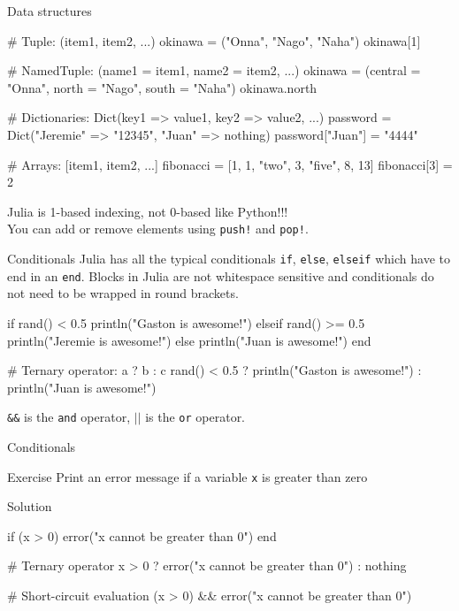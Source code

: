 \documentclass{beamer}
\newenvironment{Boxx}{\begin{tcolorbox}[standard jigsaw, opacityframe=0.8, opacityback=0.0]}{\end{tcolorbox}}
\begin{document}
\begin{frame}[fragile]{Data structures}
	\begin{Boxx}
	\begin{jllisting}
  # Tuple: (item1, item2, ...)
  okinawa = ("Onna", "Nago", "Naha")
  okinawa[1] 
		
  # NamedTuple: (name1 = item1, name2 = item2, ...)
  okinawa = (central = "Onna", north = "Nago", south = "Naha")
  okinawa.north 
		
  # Dictionaries: Dict(key1 => value1, key2 => value2, ...)
  password = Dict("Jeremie" => "12345", "Juan" => nothing)
  password["Juan"] = "4444"
		
  # Arrays: [item1, item2, ...]
  fibonacci = [1, 1, "two", 3, "five", 8, 13]
  fibonacci[3] = 2
	\end{jllisting}
\end{Boxx}

Julia is 1-based indexing, not 0-based like Python!!!\\
You can add or remove elements using \verb|push!| and \verb|pop!|.
\end{frame}


\begin{frame}[fragile]{Conditionals}
  Julia has all the typical conditionals \verb|if|, \verb|else|, \verb|elseif| which have to end in an \verb|end|.
  Blocks in Julia are not whitespace sensitive and conditionals do not need to be wrapped in round brackets.
  \begin{Boxx}
  \begin{jllisting}
  if rand() < 0.5
    println("Gaston is awesome!")
  elseif rand() >= 0.5
    println("Jeremie is awesome!")
  else
    println("Juan is awesome!")
  end
  
  # Ternary operator: a ? b : c
  rand() < 0.5 ? println("Gaston  is awesome!") : println("Juan  is awesome!")
\end{jllisting}
\end{Boxx}

\verb|&&| is the \verb|and| operator, $||$ is the \verb|or| operator.
\end{frame}


\begin{frame}[fragile]{Conditionals}
	\begin{block}{Exercise}
	Print an error message if a variable \verb|x| is greater than zero
	\end{block}
	\vfill
	\begin{block}{Solution}
		\vspace*{1mm}
		\begin{jllisting}[mathescape]
  if (x > 0) error("x cannot be greater than 0") end
	
  # Ternary operator		
  x > 0 ? error("x cannot be greater than 0") : nothing
			
  # Short-circuit evaluation
  (x > 0) && error("x cannot be greater than 0")
		\end{jllisting}
	\vspace*{1mm}
	\end{block}
\end{frame}
\end{document}
